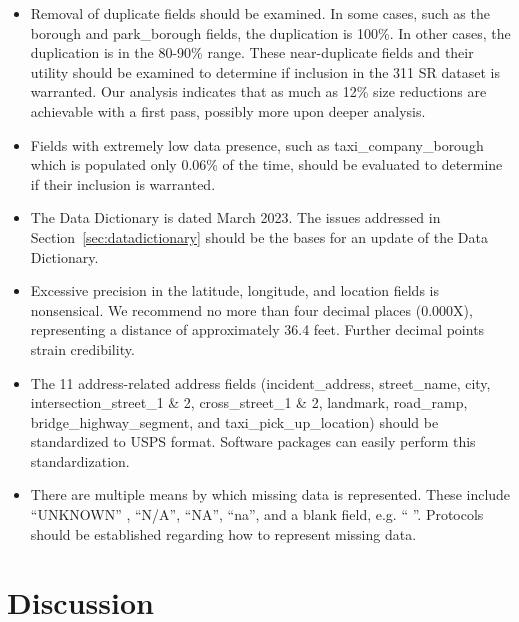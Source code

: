 \documentclass[12pt, titlepage]{article}
\begin{document}
\begin{itemize}
	\item Removal of duplicate fields should be examined. In some cases, such 
	as the borough and park\_borough fields, the duplication is 100\%. In 
	other cases, the duplication is in the 80-90\% range. These near-duplicate 
	fields and 	their utility should be examined to determine if inclusion in the 
	311 SR dataset is warranted. Our analysis indicates that as much as 12\% 
	size reductions are achievable with a first pass, possibly more upon deeper
	analysis.
	
	\item Fields with extremely low data presence, such as taxi\_company\_borough 
	which is populated only 0.06\% of the time, should be evaluated 
	to determine if their inclusion is warranted.
	
	\item The Data Dictionary is dated March 2023. The issues addressed 
	in Section~\ref{sec:datadictionary} should be the bases for an update of
	the Data Dictionary.
	
	\item Excessive precision in the latitude, longitude, and location 
	fields is nonsensical.  We recommend no more than 
	four decimal places (0.000X), representing a distance of approximately 
	36.4 feet. Further decimal points strain credibility.

	\item The 11 address-related address fields (incident\_address, 
	street\_name, city, intersection\_street\_1 \& 2, cross\_street\_1 \& 2,  
	landmark, road\_ramp, bridge\_highway\_segment, and 
	taxi\_pick\_up\_location) should be standardized to USPS format. 
	Software packages can easily perform this standardization. 
	
	\item There are multiple means by which missing data is 
	represented. These include ``UNKNOWN'' , ``N/A'', ``NA'', ``na'', and 
	a blank field, e.g. `` ''. Protocols should be established regarding 
	how to represent missing data.
\end{itemize}


\section{Discussion} \label{sec:discussion}



\end{document}
